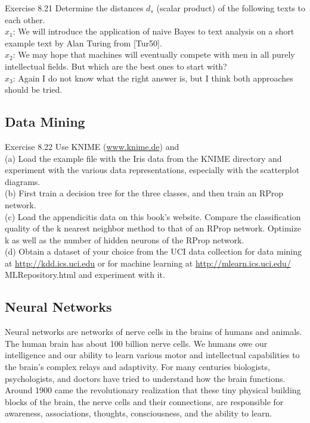\documentclass[10pt]{book}
\begin{document}
Exercise 8.21 Determine the distances $d_{s}$ (scalar product) of the following texts to each other.\\
$x_{1}$: We will introduce the application of naive Bayes to text analysis on a short example text by Alan Turing from [Tur50].\\
$x_{2}$: We may hope that machines will eventually compete with men in all purely intellectual fields. But which are the best ones to start with?\\
$x_{3}$: Again I do not know what the right answer is, but I think both approaches should be tried.

\subsection{Data Mining}
Exercise 8.22 Use KNIME (\href{http://www.knime.de}{www.knime.de}) and\\
(a) Load the example file with the Iris data from the KNIME directory and experiment with the various data representations, especially with the scatterplot diagrams.\\
(b) First train a decision tree for the three classes, and then train an RProp network.\\
(c) Load the appendicitis data on this book's website. Compare the classification quality of the k nearest neighbor method to that of an RProp network. Optimize k as well as the number of hidden neurons of the RProp network.\\
(d) Obtain a dataset of your choice from the UCI data collection for data mining at \href{http://kdd.ics.uci.edu}{http://kdd.ics.uci.edu} or for machine learning at \href{http://mlearn.ics.uci.edu/}{http://mlearn.ics.uci.edu/} MLRepository.html and experiment with it.
\subsection{Neural Networks}
Neural networks are networks of nerve cells in the brains of humans and animals. The human brain has about 100 billion nerve cells. We humans owe our intelligence and our ability to learn various motor and intellectual capabilities to the brain's complex relays and adaptivity. For many centuries biologists, psychologists, and doctors have tried to understand how the brain functions. Around 1900 came the revolutionary realization that these tiny physical building blocks of the brain, the nerve cells and their connections, are responsible for awareness, associations, thoughts, consciousness, and the ability to learn.
\end{document}
